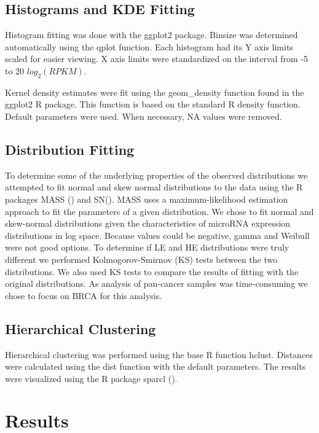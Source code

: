 \documentclass[12pt]{report}
\begin{document}
\subsection*{Histograms and KDE Fitting}
Histogram fitting was done with the ggplot2 package. Binsize was determined automatically using the qplot function. Each histogram had its Y axis limits scaled for easier viewing.
X axis limits were standardized on the interval from -5 to 20 $log_{2}(RPKM)$.


Kernel density estimates were fit using the geom\_density function found in the ggplot2 R package. This function is based on the standard R density function.
Default parameters were used. When necessary, NA values were removed.

\subsection*{Distribution Fitting}
 To determine some of the underlying properties of the observed distributions we attempted to fit normal and skew normal distributions to the data using the R packages MASS () and SN(). MASS uses
 a maximum-likelihood estimation approach to fit the parameters of a given distribution. We chose to fit normal and skew-normal distributions given the characteristics of
 microRNA expression distributions in log space. Because values could be negative, gamma and Weibull were not good options. To determine if LE and HE distributions were truly different we performed
 Kolmogorov-Smirnov (KS) tests between the two distributions. We also used KS tests to compare the results of fitting with the original distributions. As analysis of pan-cancer samples was time-consuming
 we chose to focus on BRCA for this analysis.

\subsection*{Hierarchical Clustering}
Hierarchical clustering was performed using the base R function hclust. Distances were calculated using the dist function with the default parameters. The results were visualized using
the R package sparcl ().

\section*{Results}
\end{document}
